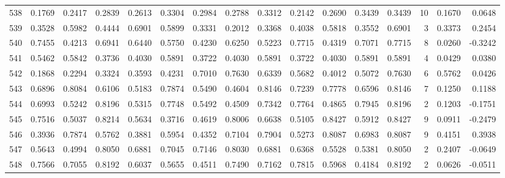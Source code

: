\begin{tabular}{lrrrrrrrrrrrrrrr}
538 &      0.1769 &  0.2417 &  0.2839 &  0.2613 &  0.3304 &  0.2984 &  0.2788 &  0.3312 &  0.2142 &  0.2690 &   0.3439 &     0.3439 &     10 &                    0.1670 &                     0.0648 \\
539 &      0.3528 &  0.5982 &  0.4444 &  0.6901 &  0.5899 &  0.3331 &  0.2012 &  0.3368 &  0.4038 &  0.5818 &   0.3552 &     0.6901 &      3 &                    0.3373 &                     0.2454 \\
540 &      0.7455 &  0.4213 &  0.6941 &  0.6440 &  0.5750 &  0.4230 &  0.6250 &  0.5223 &  0.7715 &  0.4319 &   0.7071 &     0.7715 &      8 &                    0.0260 &                    -0.3242 \\
541 &      0.5462 &  0.5842 &  0.3736 &  0.4030 &  0.5891 &  0.3722 &  0.4030 &  0.5891 &  0.3722 &  0.4030 &   0.5891 &     0.5891 &      4 &                    0.0429 &                     0.0380 \\
542 &      0.1868 &  0.2294 &  0.3324 &  0.3593 &  0.4231 &  0.7010 &  0.7630 &  0.6339 &  0.5682 &  0.4012 &   0.5072 &     0.7630 &      6 &                    0.5762 &                     0.0426 \\
543 &      0.6896 &  0.8084 &  0.6106 &  0.5183 &  0.7874 &  0.5490 &  0.4604 &  0.8146 &  0.7239 &  0.7778 &   0.6596 &     0.8146 &      7 &                    0.1250 &                     0.1188 \\
544 &      0.6993 &  0.5242 &  0.8196 &  0.5315 &  0.7748 &  0.5492 &  0.4509 &  0.7342 &  0.7764 &  0.4865 &   0.7945 &     0.8196 &      2 &                    0.1203 &                    -0.1751 \\
545 &      0.7516 &  0.5037 &  0.8214 &  0.5634 &  0.3716 &  0.4619 &  0.8006 &  0.6638 &  0.5105 &  0.8427 &   0.5912 &     0.8427 &      9 &                    0.0911 &                    -0.2479 \\
546 &      0.3936 &  0.7874 &  0.5762 &  0.3881 &  0.5954 &  0.4352 &  0.7104 &  0.7904 &  0.5273 &  0.8087 &   0.6983 &     0.8087 &      9 &                    0.4151 &                     0.3938 \\
547 &      0.5643 &  0.4994 &  0.8050 &  0.6881 &  0.7045 &  0.7146 &  0.8030 &  0.6881 &  0.6368 &  0.5528 &   0.5381 &     0.8050 &      2 &                    0.2407 &                    -0.0649 \\
548 &      0.7566 &  0.7055 &  0.8192 &  0.6037 &  0.5655 &  0.4511 &  0.7490 &  0.7162 &  0.7815 &  0.5968 &   0.4184 &     0.8192 &      2 &                    0.0626 &                    -0.0511 \\

\end{tabular}
